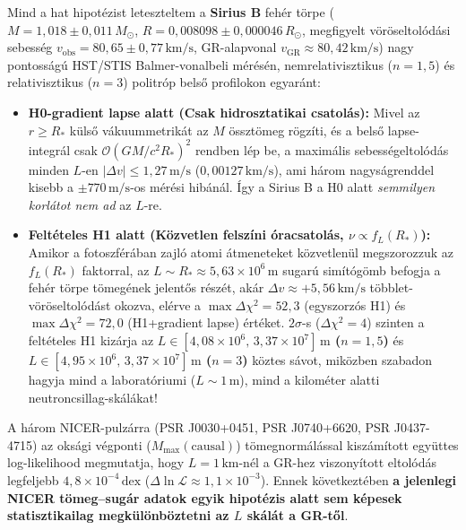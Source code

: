\par
Mind a hat hipot\'ezist leteszteltem a \textbf{Sirius B} feh\'er t\"orpe ($M = 1{,}018 \pm 0{,}011\,M_\odot$, $R = 0{,}008098 \pm 0{,}000046\,R_\odot$, megfigyelt v\"or\"oseltol\'od\'asi sebess\'eg $v_{\text{obs}} = 80{,}65 \pm 0{,}77\,\text{km/s}$, GR-alapvonal $v_{\text{GR}} \approx 80{,}42\,\text{km/s}$) nagy pontoss\'ag\'u HST/STIS Balmer-vonalbeli m\'er\'es\'en, nemrelativisztikus ($n=1{,}5$) \'es relativisztikus ($n=3$) politr\'op bels\H{o} profilokon egyar\'ant:
\begin{itemize}\setlength{\itemsep}{1.5pt}\setlength{\parskip}{0pt}\setlength{\topsep}{1pt}
  \item \textbf{H0-gradient lapse alatt (Csak hidrosztatikai csatol\'as):} Mivel az $r \ge R_*$ k\"uls\H{o} v\'akuummetrik\'at az $M$ \"osszt\"omeg r\"ogz\'iti, \'es a bels\H{o} lapse-integr\'al csak $\mathcal{O}(GM/c^2 R_*)^2$ rendben l\'ep be, a maxim\'alis sebess\'egeltol\'od\'as minden $L$-en \textbf{$|\Delta v| \le 1{,}27\,\text{m/s}$} ($0{,}00127\,\text{km/s}$), ami h\'arom nagys\'agrenddel kisebb a $\pm 770\,\text{m/s}$-os m\'er\'esi hib\'an\'al. \'Igy a Sirius B a H0 alatt \emph{semmilyen korl\'atot nem ad} az $L$-re.
  \item \textbf{Felt\'eteles H1 alatt (K\"ozvetlen felsz\'ini \'oracsatol\'as, $\nu \propto f_L(R_*)$):} Amikor a fotoszf\'er\'aban zajl\'o atomi \'atmeneteket k\"ozvetlen\"ul megszorozzuk az $f_L(R_*)$ faktorral, az $L \sim R_* \approx 5{,}63\times 10^6\,\text{m}$ sugar\'u sim\'it\'og\"omb befogja a feh\'er t\"orpe t\"omeg\'enek jelent\H{o}s r\'esz\'et, ak\'ar $\Delta v \approx +5{,}56\,\text{km/s}$ t\"obblet-v\"or\"oseltol\'od\'ast okozva, el\'erve a \textbf{$\max\Delta\chi^2 = 52{,}3$} (egyszorz\'os H1) \'es \textbf{$\max\Delta\chi^2 = 72{,}0$} (H1+gradient lapse) \'ert\'eket. $2\sigma$-s ($\Delta\chi^2 = 4$) szinten a felt\'eteles H1 kiz\'arja az \textbf{$L \in [4{,}08\times 10^6,\, 3{,}37\times 10^7]\,\text{m}$ ($n=1{,}5$)} \'es \textbf{$L \in [4{,}95\times 10^6,\, 3{,}37\times 10^7]\,\text{m}$ ($n=3$)} k\"oztes s\'avot, mik\"ozben szabadon hagyja mind a laborat\'oriumi ($L \sim 1\,\text{m}$), mind a kilom\'eter alatti neutroncsillag-sk\'al\'akat!
\end{itemize}

\par
A h\'arom NICER-pulz\'arra (PSR J0030+0451, PSR J0740+6620, PSR J0437-4715) az oks\'agi v\'egponti ($M_{\text{max}}(\text{causal})$) t\"omegnorm\'al\'assal kisz\'am\'itott egy\"uttes log-likelihood megmutatja, hogy $L = 1\,\text{km}$-n\'el a GR-hez viszony\'itott eltol\'od\'as legfeljebb \textbf{$4{,}8\times 10^{-4}\,\text{dex}$} ($\Delta\ln\mathcal{L} \approx 1{,}1\times 10^{-3}$). Ennek k\"ovetkezt\'eben \textbf{a jelenlegi NICER t\"omeg--sug\'ar adatok egyik hipot\'ezis alatt sem k\'epesek statisztikailag megk\"ul\"onb\"oztetni az $L$ sk\'al\'at a GR-t\H{o}l}.
\newpage


